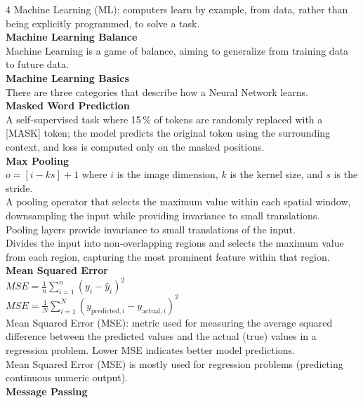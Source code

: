\documentclass[8pt]{extarticle}
\begin{document}
\begin{multicols}{4}
Machine Learning (ML): computers learn by example, from data, rather than being explicitly programmed, to solve a task.\\
\vspace{2pt}\textbf{Machine Learning Balance}\\
Machine Learning is a game of balance, aiming to generalize from training data to future data.\\
\vspace{2pt}\textbf{Machine Learning Basics}\\
There are three categories that describe how a Neural Network learns.\\
\vspace{2pt}\textbf{Masked Word Prediction}\\
A self‑supervised task where 15\,\% of tokens are randomly replaced with a [MASK] token; the model predicts the original token using the surrounding context, and loss is computed only on the masked positions.\\
\vspace{2pt}\textbf{Max Pooling}\\
$o = [i - k s] + 1$ where $i$ is the image dimension, $k$ is the kernel size, and $s$ is the stride.\\
A pooling operator that selects the maximum value within each spatial window, downsampling the input while providing invariance to small translations.\\
Pooling layers provide invariance to small translations of the input.\\
Divides the input into non‑overlapping regions and selects the maximum value from each region, capturing the most prominent feature within that region.\\
\vspace{2pt}\textbf{Mean Squared Error}\\
$MSE = \frac{1}{n} \sum_{i=1}^{n} (y_i - \hat{y}_i)^2$\\
$MSE = \frac{1}{N} \sum_{i=1}^{N} (y_{\text{predicted},i} - y_{\text{actual},i})^2$\\
Mean Squared Error (MSE): metric used for measuring the average squared difference between the predicted values and the actual (true) values in a regression problem. Lower MSE indicates better model predictions.\\
Mean Squared Error (MSE) is mostly used for regression problems (predicting continuous numeric output).\\
\vspace{2pt}\textbf{Message Passing}\\


\end{multicols}
\end{document}
